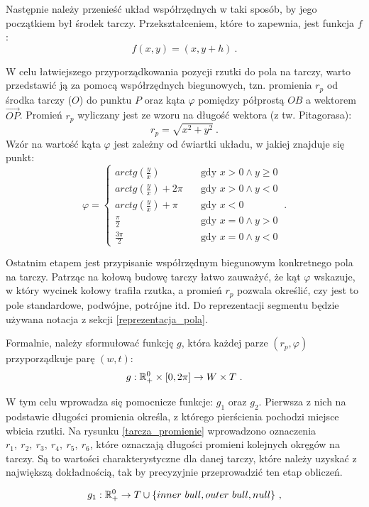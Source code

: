 Następnie należy przenieść układ współrzędnych w taki sposób, by jego początkiem był środek tarczy. Przekształceniem, które to zapewnia, jest funkcja $f$:
\[
f(x, y) = (x, y + h)\ .
\]

W celu łatwiejszego przyporządkowania pozycji rzutki do pola na tarczy, warto przedstawić ją za pomocą współrzędnych biegunowych, tzn. promienia $r_p$ od środka tarczy ($O$) do punktu $P$ oraz kąta $\varphi$ pomiędzy półprostą $OB$ a wektorem $\overrightarrow{OP}$. \newline
Promień $r_p$ wyliczany jest ze wzoru na długość wektora (z tw. Pitagorasa):
\[
r_p = \sqrt{x^2 + y^2}\ .
\]
Wzór na wartość kąta $\varphi$ jest zależny od ćwiartki układu, w jakiej znajduje się punkt:
\[
\varphi = 
     \begin{cases}
       arctg(\frac{y}{x}) &\quad\text{gdy } x > 0 \land y \ge 0 \\
       arctg(\frac{y}{x}) + 2\pi &\quad\text{gdy } x > 0 \land y < 0 \\
       arctg(\frac{y}{x})+ \pi &\quad\text{gdy } x < 0 \\
       \frac{\pi}{2} &\quad\text{gdy } x = 0 \land y > 0 \\ 
       \frac{3\pi}{2} &\quad\text{gdy } x = 0 \land y < 0
     \end{cases}\ .
\]

Ostatnim etapem jest przypisanie współrzędnym biegunowym konkretnego pola na tarczy. Patrząc na kołową budowę tarczy łatwo zauważyć, że kąt $\varphi$ wskazuje, w który wycinek kołowy trafiła rzutka, a promień $r_p$ pozwala określić, czy jest to pole standardowe, podwójne, potrójne itd. Do reprezentacji segmentu będzie używana notacja z sekcji \ref{reprezentacja_pola}.

Formalnie, należy sformułować funkcję $g$, która każdej parze $(r_p, \varphi)$ przyporządkuje parę $(w, t)$:
\[
g: \RR^0_+ \times [0, 2\pi] \to W \times T\ .
\]

W tym celu wprowadza się pomocnicze funkcje: $g_1$ oraz $g_2$. Pierwsza z nich na podstawie długości promienia określa, z którego pierścienia pochodzi miejsce wbicia rzutki. Na rysunku \ref{tarcza_promienie} wprowadzono oznaczenia $r_1,\ r_2,\ r_3,\ r_4,\ r_5,\ r_6$, które oznaczają długości promieni kolejnych okręgów na tarczy. Są to wartości charakterystyczne dla danej tarczy, które należy uzyskać z największą dokładnością, tak by precyzyjnie przeprowadzić ten etap obliczeń. 

\[
g_1: \mathbb{R}^0_+ \to T \cup \{inner\ bull, outer\ bull, null \}\ ,
\]

